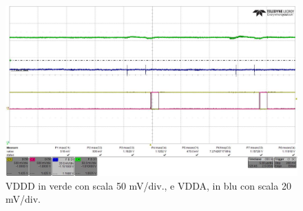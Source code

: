 \begin{figure}
\centering
\includegraphics[scale=.3]{Immagini/alllin2}
\caption{VDDD in verde con scala 50 mV/div., e VDDA, in blu con scala 20 mV/div.}
\label{alllin2}
\end{figure}

